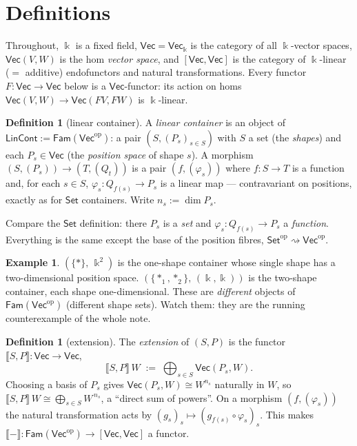 \documentclass[11pt]{amsart}
\theoremstyle{plain}
\theoremstyle{definition}
\newtheorem{definition}[theorem]{Definition}
\newtheorem{example}[theorem]{Example}
\renewcommand{\Vec}{\mathsf{Vec}}
\newcommand{\Set}{\mathsf{Set}}
\newcommand{\LinCont}{\mathsf{LinCont}}
\newcommand{\Fam}{\mathsf{Fam}}
\newcommand{\op}{\mathrm{op}}
\newcommand{\ext}[1]{\llbracket #1 \rrbracket}
\newcommand{\fld}{\Bbbk}
\newcommand{\bul}{{-}}
\newcommand{\iso}{\cong}
\begin{document}
\section{Definitions}\label{sec:defs}

Throughout, $\fld$ is a fixed field, $\Vec=\Vec_\fld$ is the category of all
$\fld$-vector spaces, $\Vec(V,W)$ is the hom \emph{vector space}, and
$[\Vec,\Vec]$ is the category of $\fld$-linear ($=$ additive) endofunctors and
natural transformations. Every functor $F\colon \Vec\to\Vec$ below is a
$\Vec$-functor: its action on homs $\Vec(V,W)\to\Vec(FV,FW)$ is $\fld$-linear.

\begin{definition}[linear container]\label{def:lincont}
A \emph{linear container} is an object of $\LinCont := \Fam(\Vec^\op)$: a pair
$(S,(P_s)_{s\in S})$ with $S$ a set (the \emph{shapes}) and each
$P_s\in\Vec$ (the \emph{position space} of shape $s$). A morphism
$(S,(P_s))\to(T,(Q_t))$ is a pair $(f,(\varphi_s))$ where $f\colon S\to T$ is a
function and, for each $s\in S$, $\varphi_s\colon Q_{f(s)}\to P_s$ is a linear
map --- contravariant on positions, exactly as for $\Set$ containers. Write
$n_s := \dim P_s$.
\end{definition}

Compare the $\Set$ definition: there $P_s$ is a \emph{set} and $\varphi_s\colon
Q_{f(s)}\to P_s$ a \emph{function}. Everything is the same except the base of
the position fibres, $\Set^\op \rightsquigarrow \Vec^\op$.

\begin{example}
$(\{*\},\,\fld^2)$ is the one-shape container whose single shape has a
two-dimensional position space. $(\{*_1,*_2\},\,(\fld,\fld))$ is the two-shape
container, each shape one-dimensional. These are \emph{different} objects of
$\Fam(\Vec^\op)$ (different shape sets). Watch them: they are the running
counterexample of the whole note.
\end{example}

\begin{definition}[extension]\label{def:ext}
The \emph{extension} of $(S,P)$ is the functor $\ext{S,P}\colon\Vec\to\Vec$,
\[
  \ext{S,P}\,W \;:=\; \bigoplus_{s\in S} \Vec(P_s, W).
\]
Choosing a basis of $P_s$ gives $\Vec(P_s,W)\iso W^{n_s}$ naturally in $W$, so
$\ext{S,P}\,W \iso \bigoplus_{s\in S} W^{\,n_s}$, a ``direct sum of powers''.
On a morphism $(f,(\varphi_s))$ the natural transformation acts by
$(g_s)_s \mapsto (g_{f(s)}\circ\varphi_s)_s$. This makes
$\ext{\bul}\colon\Fam(\Vec^\op)\to[\Vec,\Vec]$ a functor.
\end{definition}
\end{document}
